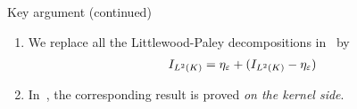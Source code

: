 \documentclass[handout]{beamer}
\begin{document}
\begin{frame}{Key argument (continued)}
    \begin{enumerate}
        \item
            We replace all the Littlewood-Paley decompositions in~\cite{Fischer2015,FischerRuzhansky16} by
            \begin{align*}
                {I_{{L^{2} (K)}}}
                =
                \eta_\varepsilon +
                ({I_{{L^{2} (K)}}} - \eta_\varepsilon)
            \end{align*}
        \item
            In~\cite{FischerRuzhansky16,Fischer2015},
            the corresponding result is proved \emph{on the kernel side}.
    \end{enumerate}
\end{frame}
\end{document}
